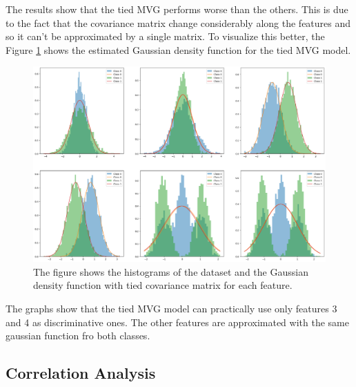 \documentclass{article}
\begin{document}
The results show that the tied MVG performs worse than the others. This is due to the fact that the covariance matrix change considerably along the features and so it can't be approximated by a single matrix. To visualize this better, the Figure \ref{fig:dataset_gaussian_tied} shows the estimated Gaussian density function for the tied MVG model.

\begin{figure}[ht]
    \centering
    \includegraphics[width=\textwidth]{images/dataset_gaussian_tied.png}
    \caption{The figure shows the histograms of the dataset and the Gaussian density function with tied covariance matrix for each feature.}
    \label{fig:dataset_gaussian_tied}
\end{figure}

The graphs show that the tied MVG model can practically use only features 3 and 4 as discriminative ones. The other features are approximated with the same gaussian function fro both classes.

\subsection{Correlation Analysis}
\end{document}
